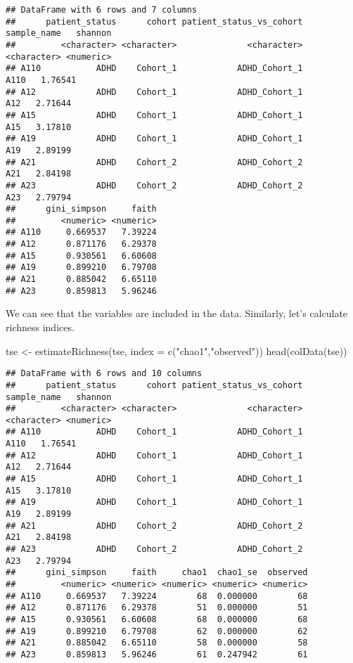 \documentclass[
  oneside]{book}
\newenvironment{Shaded}{\begin{snugshade}}{\end{snugshade}}
\newcommand{\AttributeTok}[1]{\textcolor[rgb]{0.77,0.63,0.00}{#1}}
\newcommand{\FunctionTok}[1]{\textcolor[rgb]{0.00,0.00,0.00}{#1}}
\newcommand{\NormalTok}[1]{#1}
\newcommand{\OtherTok}[1]{\textcolor[rgb]{0.56,0.35,0.01}{#1}}
\newcommand{\StringTok}[1]{\textcolor[rgb]{0.31,0.60,0.02}{#1}}
\begin{document}
\begin{verbatim}
## DataFrame with 6 rows and 7 columns
##      patient_status      cohort patient_status_vs_cohort sample_name   shannon
##         <character> <character>              <character> <character> <numeric>
## A110           ADHD    Cohort_1            ADHD_Cohort_1        A110   1.76541
## A12            ADHD    Cohort_1            ADHD_Cohort_1         A12   2.71644
## A15            ADHD    Cohort_1            ADHD_Cohort_1         A15   3.17810
## A19            ADHD    Cohort_1            ADHD_Cohort_1         A19   2.89199
## A21            ADHD    Cohort_2            ADHD_Cohort_2         A21   2.84198
## A23            ADHD    Cohort_2            ADHD_Cohort_2         A23   2.79794
##      gini_simpson     faith
##         <numeric> <numeric>
## A110     0.669537   7.39224
## A12      0.871176   6.29378
## A15      0.930561   6.60608
## A19      0.899210   6.79708
## A21      0.885042   6.65110
## A23      0.859813   5.96246
\end{verbatim}

We can see that the variables are included in the data.
Similarly, let's calculate richness indices.

\begin{Shaded}
\begin{Highlighting}[]
\NormalTok{tse }\OtherTok{\textless{}{-}} \FunctionTok{estimateRichness}\NormalTok{(tse, }
                              \AttributeTok{index =} \FunctionTok{c}\NormalTok{(}\StringTok{"chao1"}\NormalTok{,}\StringTok{"observed"}\NormalTok{))}
\FunctionTok{head}\NormalTok{(}\FunctionTok{colData}\NormalTok{(tse))}
\end{Highlighting}
\end{Shaded}

\begin{verbatim}
## DataFrame with 6 rows and 10 columns
##      patient_status      cohort patient_status_vs_cohort sample_name   shannon
##         <character> <character>              <character> <character> <numeric>
## A110           ADHD    Cohort_1            ADHD_Cohort_1        A110   1.76541
## A12            ADHD    Cohort_1            ADHD_Cohort_1         A12   2.71644
## A15            ADHD    Cohort_1            ADHD_Cohort_1         A15   3.17810
## A19            ADHD    Cohort_1            ADHD_Cohort_1         A19   2.89199
## A21            ADHD    Cohort_2            ADHD_Cohort_2         A21   2.84198
## A23            ADHD    Cohort_2            ADHD_Cohort_2         A23   2.79794
##      gini_simpson     faith     chao1  chao1_se  observed
##         <numeric> <numeric> <numeric> <numeric> <numeric>
## A110     0.669537   7.39224        68  0.000000        68
## A12      0.871176   6.29378        51  0.000000        51
## A15      0.930561   6.60608        68  0.000000        68
## A19      0.899210   6.79708        62  0.000000        62
## A21      0.885042   6.65110        58  0.000000        58
## A23      0.859813   5.96246        61  0.247942        61
\end{verbatim}
\end{document}
